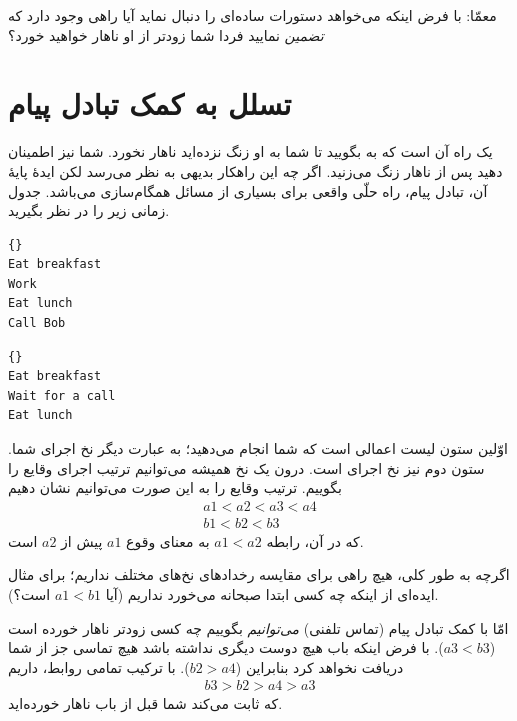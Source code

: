 \documentclass{book}
\newcommand{\clearemptydoublepage}{}%
\begin{document}
    معمّا: با فرض اینکه  می‌خواهد دستورات ساده‌ای را دنبال نماید آیا راهی وجود دارد که \emph{تضمین} نمایید فردا شما زودتر از او ناهار خواهید خورد؟
    
\clearemptydoublepage
\section {تسلل به کمک تبادل پیام}
\label{serialization}

    یک راه آن است که به  بگویید تا شما به او زنگ نزده‌اید ناهار نخورد. شما نیز  اطمینان دهید پس از ناهار زنگ می‌زنید. 
    اگر چه این راهکار بدیهی به نظر می‌رسد لکن ایدهٔ پایهٔ آن، تبادل پیام، راه حلّی واقعی برای بسیاری
    از مسائل همگام‌سازی می‌باشد. جدول زمانی زیر را در نظر بگیرید. 
    
\begin{latin}
\begin{minipage}[t]{2in}
\begin{latin}
\begin{lstlisting}[title=\rl{نخ \lr{A} (شما)}]{}
Eat breakfast 
Work          
Eat lunch     
Call Bob
\end{lstlisting}
\end{latin}
\end{minipage}
\hfill
\begin{minipage}[t]{2in}
\begin{latin}
\begin{lstlisting}[title=\rl{نخ \lr{B} (‌Bob)}]{}
Eat breakfast
Wait for a call
Eat lunch
\end{lstlisting}
\end{latin}
\end{minipage}
\end{latin}
%
    اوّلین ستون لیست اعمالی است که شما انجام می‌دهید؛ به عبارت دیگر نخ اجرای شما. 
    ستون دوم نیز نخ اجرای  است. درون یک نخ همیشه می‌توانیم ترتیب اجرای وقایع را بگوییم. 
    ترتیب وقایع را به این صورت می‌توانیم نشان دهیم
%
\begin{eqnarray*}
a1 < a2 < a3 < a4  \\
b1 < b2 < b3
\end{eqnarray*}
%
    که در آن، رابطه  $a1 < a2$ به معنای وقوع  $a1$ پیش از  $a2$ است. 

    اگرچه به طور کلی، هیچ راهی برای مقایسه رخدادهای نخ‌های مختلف نداریم؛ برای مثال ایده‌ای از اینکه چه کسی ابتدا صبحانه می‌خورد نداریم 
    (آیا $a1 < b1$  است؟).
    
    امّا با کمک تبادل پیام (تماس تلفنی) \emph{می‌توانیم} بگوییم چه کسی زودتر ناهار خورده است ($a3 < b3$).
    با فرض اینکه باب هیچ دوست دیگری نداشته باشد هیچ تماسی جز از شما دریافت نخواهد کرد بنابراین  ($b2 > a4$).
    با ترکیب تمامی روابط، داریم 
%
\begin{eqnarray*}
b3 > b2 > a4 > a3
\end{eqnarray*}
%
    که ثابت می‌کند شما قبل از باب ناهار خورده‌اید. 
\end{document}
